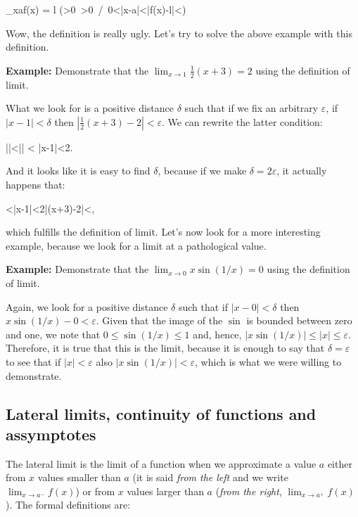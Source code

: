 \bnn
\lim_{x\rightarrow a}f(x) = l \Leftrightarrow (\forall\varepsilon>0\ \exists\delta>0\ /\ 0<|x-a|<\delta\Rightarrow |f(x)-l|<\varepsilon)
\enn
\vs

Wow, the definition is really ugly. Let's try to solve the above example with this definition.

{\bf Example:} Demonstrate that the $\lim_{x\rightarrow 1} \frac{1}{2}(x+3)=2$ using the definition of limit.

What we look for is a positive distance $\delta$ such that if we fix an arbitrary $\varepsilon$, if $|x-1|<\delta$ then $ |\frac{1}{2}(x+3)-2|<\varepsilon$. We can rewrite the latter condition:

\bnn
 ||<\varepsilon \Rightarrow || < \varepsilon \Rightarrow |x-1|<2\varepsilon.
\enn

And it looks like it is easy to find $\delta$, because if we make $\delta = 2\varepsilon$, it actually happens that:

<|x-1|<2\varepsilon \Rightarrow |(x+3)-2|<\varepsilon,
\enn

which fulfills the definition of limit. Let's now look for a more interesting example, because
we look for a limit at a pathological value.

{\bf Example:} Demonstrate that the $\lim_{x\rightarrow 0} x\sin(1/x)=0$ using the definition of limit.

Again, we look for a positive distance $\delta$ such that if $|x-0|<\delta$ then 
$x\sin(1/x)-0 < \varepsilon$. Given that the image of the $\sin$ is bounded between
zero and one, we note that $0 \leq \sin(1/x)\leq 1$ and, hence, $|x\sin(1/x)|\leq |x| \leq \varepsilon$. Therefore, it is true that this is the limit, because it is enough to say that
$\delta = \varepsilon$ to see that if $|x| < \varepsilon$ also $|x\sin(1/x)|<\varepsilon$,
which is what we were willing to demonstrate.

\subsection{Lateral limits, continuity of functions and assymptotes}

The lateral limit is the limit of a function when we approximate a value $a$ either from $x$ values smaller than $a$ (it is said \emph{from the left} and we write $\lim_{x\rightarrow a^{-}}f(x)$) or from $x$ values larger than $a$ (\emph{from the right}, $\lim_{x\rightarrow a^{+}}f(x)$). The
formal definitions are:

